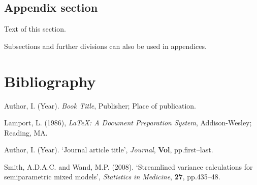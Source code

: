 \documentclass[a4paper, 12pt, notitlepage]{report}
\begin{document}
\section{Appendix section}
%
Text of this section.

Subsections and further divisions can also be used in appendices.

\chapter*{Bibliography}
%
\begin{description}

\item Author, I. (Year). \emph{Book Title}, Publisher; Place of publication.

\item Lamport, L. (1986), \emph{\LaTeX: A Document Preparation System}, Addison-Wesley; Reading, MA.

\item Author, I. (Year). `Journal article title', \emph{Journal}, \textbf{Vol}, pp.first--last.

\item Smith, A.D.A.C. and Wand, M.P. (2008). `Streamlined variance calculations for semiparametric
mixed models', \emph{Statistics in Medicine}, \textbf{27}, pp.435--48.

\end{description}
\end{document}
